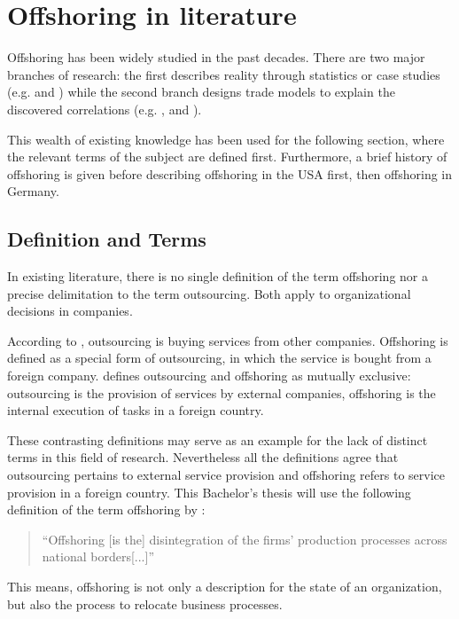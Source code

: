 \section{Offshoring in literature}
Offshoring has been widely studied in the past decades. There are two major branches of research: the first describes reality through statistics or case studies (e.g. \cite{Rottman.2008} and \cite{Pedersen.2013}) while the second branch designs trade models to explain the discovered correlations (e.g. \cite{Antras.2004}, \cite{Grossman.2008} and \cite{Helpman.1999}).

This wealth of existing knowledge has been used for the following section, where the relevant terms of the subject are defined first. Furthermore, a brief history of offshoring is given before describing offshoring in the USA first, then offshoring in Germany.

\subsection{Definition and Terms}
In existing literature, there is no single definition of the term offshoring nor a precise delimitation to the term outsourcing. Both apply to organizational decisions in companies. 

According to \cite[pp. 1f]{Specht.2007}, outsourcing is buying services from other companies. Offshoring is defined as a special form of outsourcing, in which the service is bought from a foreign company. \cite[p. 2]{Alebrand.2013} defines outsourcing and offshoring as mutually exclusive: outsourcing is the provision of services by external companies, offshoring is the internal execution of tasks in a foreign country.

These contrasting definitions may serve as an example for the lack of distinct terms in this field of research. Nevertheless all the definitions agree that outsourcing pertains to external service provision and offshoring refers to service provision in a foreign country. This Bachelor's thesis will use the following definition of the term offshoring by \cite[p. 321]{Andersson.2016}:

\begin{quote}
	``Offshoring [is the] disintegration of the firms’ production processes across national borders[...]''
\end{quote} 

This means, offshoring is not only a description for the state of an organization, but also the process to relocate business processes.

